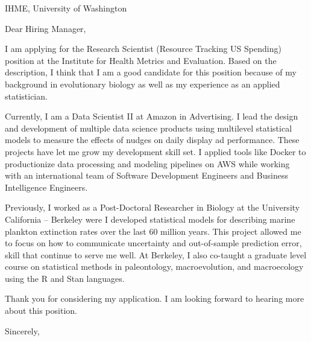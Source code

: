 \documentclass{letter}
\begin{document}
\begin{letter}{IHME, University of Washington}
  \opening{Dear Hiring Manager,}

  I am applying for the Research Scientist (Resource Tracking US Spending) position at the Institute for Health Metrics and Evaluation. Based on the description, I think that I am a good candidate for this position because of my background in evolutionary biology as well as my experience as an applied statistician.

Currently, I am a Data Scientist II at Amazon in Advertising. I lead the design and development of multiple data science products using multilevel statistical models to measure the effects of nudges on daily display ad performance. These projects have let me grow my development skill set. I applied tools like Docker to productionize data processing and modeling pipelines on AWS while working with an international team of Software Development Engineers and Business Intelligence Engineers.

Previously, I worked as a Post-Doctoral Researcher in Biology at the University California -- Berkeley were I developed statistical models for describing marine plankton extinction rates over the last 60 million years. This project allowed me to focus on how to communicate uncertainty and out-of-sample prediction error, skill that continue to serve me well. At Berkeley, I also co-taught a graduate level course on statistical methods in paleontology, macroevolution, and macroecology using the R and Stan languages.

Thank you for considering my application. I am looking forward to hearing more about this position.

  \closing{Sincerely,}


\end{letter}
\end{document}
